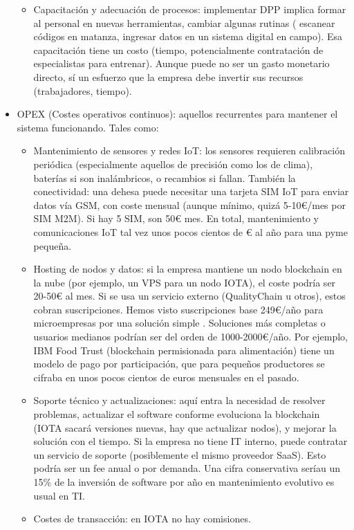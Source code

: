\begin{itemize}
\begin{itemize}
        \item Capacitación y adecuación de procesos: implementar DPP implica formar al personal en nuevas herramientas, cambiar algunas rutinas ( escanear códigos en matanza, ingresar datos en un sistema digital en campo). Esa capacitación tiene un costo (tiempo, potencialmente contratación de especialistas para entrenar). Aunque puede no ser un gasto monetario directo, sí un esfuerzo que la empresa debe invertir sus recursos (trabajadores, tiempo).
    \end{itemize}
    \item OPEX (Costes operativos continuos): aquellos recurrentes para mantener el sistema funcionando. Tales como:
    \begin{itemize}
        \item Mantenimiento de sensores y redes IoT: los sensores requieren calibración periódica (especialmente aquellos de precisión como los de clima), baterías si son inalámbricos, o recambios si fallan. También la conectividad: una dehesa puede necesitar una tarjeta SIM IoT para enviar datos vía GSM, con coste mensual (aunque mínimo, quizá 5-10€/mes por SIM M2M). Si hay 5 SIM, son 50€ mes. En total, mantenimiento y comunicaciones IoT tal vez unos pocos cientos de € al año para una pyme pequeña.
        \item Hosting de nodos y datos: si la empresa mantiene un nodo blockchain en la nube (por ejemplo, un VPS para un nodo IOTA), el coste podría ser 20-50€ al mes. Si se usa un servicio externo (QualityChain u otros), estos cobran suscripciones. Hemos visto suscripciones base 249€/año para microempresas por una solución simple \cite{salaris_trazabilidad_2020}. Soluciones más completas o usuarios medianos podrían ser del orden de 1000-2000€/año. Por ejemplo, IBM Food Trust (blockchain permisionada para alimentación) tiene un modelo de pago por participación, que para pequeños productores se cifraba en unos pocos cientos de euros mensuales en el pasado.
        \item Soporte técnico y actualizaciones: aquí entra la necesidad de resolver problemas, actualizar el software conforme evoluciona la blockchain (IOTA sacará versiones nuevas, hay que actualizar nodos), y mejorar la solución con el tiempo. Si la empresa no tiene IT interno, puede contratar un servicio de soporte (posiblemente el mismo proveedor SaaS). Esto podría ser un fee anual o por demanda. Una cifra conservativa seríau un 15\% de la inversión de software por año en mantenimiento evolutivo es usual en TI.
        \item Costes de transacción: en IOTA no hay comisiones.
    \end{itemize}
\end{itemize}

